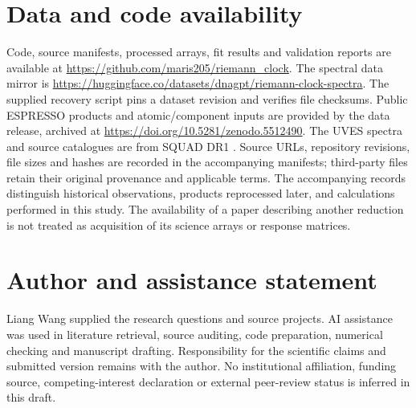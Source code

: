 \documentclass[11pt,a4paper]{article}
\begin{document}
\section*{Data and code availability}
Code, source manifests, processed arrays, fit results and validation reports are available at \url{https://github.com/maris205/riemann_clock}. The spectral data mirror is \url{https://huggingface.co/datasets/dnagpt/riemann-clock-spectra}. The supplied recovery script pins a dataset revision and verifies file checksums. Public ESPRESSO products and atomic/component inputs are provided by the \citet{Murphy2022ESPRESSO} data release, archived at \url{https://doi.org/10.5281/zenodo.5512490}. The UVES spectra and source catalogues are from SQUAD DR1 \citep{Murphy2019SQUAD}. Source URLs, repository revisions, file sizes and hashes are recorded in the accompanying manifests; third-party files retain their original provenance and applicable terms. The accompanying records distinguish historical observations, products reprocessed later, and calculations performed in this study. The availability of a paper describing another reduction is not treated as acquisition of its science arrays or response matrices.

\section*{Author and assistance statement}
Liang Wang supplied the research questions and source projects. AI assistance was used in literature retrieval, source auditing, code preparation, numerical checking and manuscript drafting. Responsibility for the scientific claims and submitted version remains with the author. No institutional affiliation, funding source, competing-interest declaration or external peer-review status is inferred in this draft.

\appendix




\end{document}
